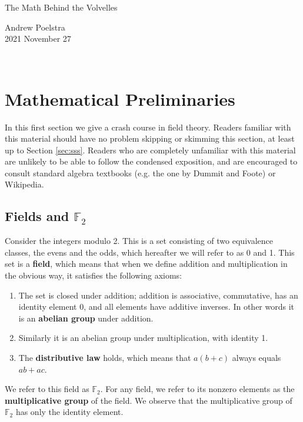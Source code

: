 \documentclass[letterpaper]{article}
\theoremstyle{xxx}
\theoremstyle{evil}
\theoremstyle{yyy}
\theoremstyle{plain}
\theoremstyle{zzz}
\newcommand{\ftwo}{\mathbb{F}_2}
\begin{document}
\begin{minipage}[b]{0.7\linewidth}
{\huge The Math Behind the Volvelles}
\end{minipage}
\begin{minipage}[b]{0.3\linewidth}
  \begin{flushright}
    Andrew Poelstra\\
    2021 November 27
  \end{flushright}
\end{minipage}
\\

\section{Mathematical Preliminaries}

In this first section we give a crash course in field theory. Readers familiar
with this material should have no problem skipping or skimming this section,
at least up to Section \ref{sec:sss}.
Readers who are completely unfamiliar with this material are unlikely to be
able to follow the condensed exposition, and are encouraged to consult
standard algebra textbooks (e.g. the one by Dummit and Foote) or Wikipedia.

\subsection{Fields and $\ftwo$}
Consider the integers modulo 2. This is a set consisting of two equivalence
classes, the evens and the odds, which hereafter we will refer to as 0 and 1.
This set is a \textbf{field}, which means that when we define addition and
multiplication in the obvious way, it satisfies the following axioms:
\begin{enumerate}
\item The set is closed under addition; addition is associative, commutative,
has an identity element 0, and all elements have additive inverses. In other
words it is an \textbf{abelian group} under addition.
\item Similarly it is an abelian group under multiplication, with identity 1.
\item The \textbf{distributive law} holds, which means that $a(b + c)$ always
equals $ab + ac$.
\end{enumerate}

We refer to this field as $\ftwo$. For any field, we refer to its nonzero
elements as the \textbf{multiplicative group} of the field. We observe that
the multiplicative group of $\ftwo$ has only the identity element.
\end{document}
